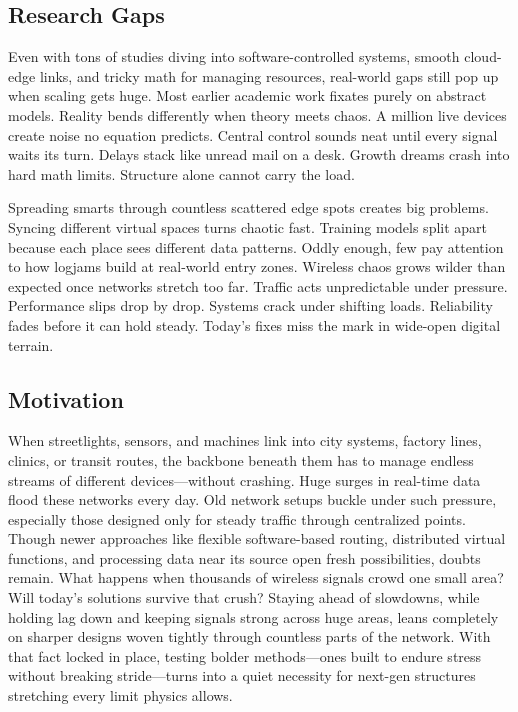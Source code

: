 \documentclass[a4paper,fleqn]{cas-dc}
\numberwithin{equation}{section}
\begin{document}
\subsection{Research Gaps}

Even with tons of studies diving into software-controlled systems, smooth cloud-edge links, and tricky math for managing resources, real-world gaps still pop up when scaling gets huge. Most earlier academic work fixates purely on abstract models. Reality bends differently when theory meets chaos. A million live devices create noise no equation predicts. Central control sounds neat until every signal waits its turn. Delays stack like unread mail on a desk. Growth dreams crash into hard math limits. Structure alone cannot carry the load.

Spreading smarts through countless scattered edge spots creates big problems. Syncing different virtual spaces turns chaotic fast. Training models split apart because each place sees different data patterns. Oddly enough, few pay attention to how logjams build at real-world entry zones. Wireless chaos grows wilder than expected once networks stretch too far. Traffic acts unpredictable under pressure. Performance slips drop by drop. Systems crack under shifting loads. Reliability fades before it can hold steady. Today's fixes miss the mark in wide-open digital terrain.

\subsection{Motivation}

When streetlights, sensors, and machines link into city systems, factory lines, clinics, or transit routes, the backbone beneath them has to manage endless streams of different devices—without crashing. Huge surges in real-time data flood these networks every day. Old network setups buckle under such pressure, especially those designed only for steady traffic through centralized points. Though newer approaches like flexible software-based routing, distributed virtual functions, and processing data near its source open fresh possibilities, doubts remain. What happens when thousands of wireless signals crowd one small area? Will today's solutions survive that crush? Staying ahead of slowdowns, while holding lag down and keeping signals strong across huge areas, leans completely on sharper designs woven tightly through countless parts of the network. With that fact locked in place, testing bolder methods—ones built to endure stress without breaking stride—turns into a quiet necessity for next-gen structures stretching every limit physics allows.
\end{document}
